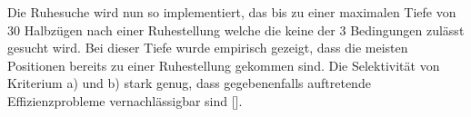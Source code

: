 Die Ruhesuche wird nun so implementiert, das bis zu einer maximalen Tiefe von 30 Halbzügen nach einer Ruhestellung welche die keine der 3 Bedingungen zulässt gesucht wird.
Bei dieser Tiefe wurde empirisch gezeigt, dass die meisten Positionen bereits zu einer Ruhestellung gekommen sind.
Die Selektivität von Kriterium a) und b) stark genug, dass gegebenenfalls auftretende Effizienzprobleme vernachlässigbar sind [\cite{Stuckardt}].
